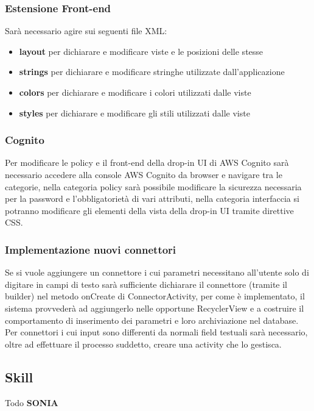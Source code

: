 \subsubsection{Estensione Front-end}
Sarà necessario agire sui seguenti file XML:
\begin{itemize}
\item \textbf{layout} per dichiarare e modificare viste e le posizioni delle stesse
\item \textbf{strings} per dichiarare e modificare stringhe utilizzate dall'applicazione
\item \textbf{colors} per dichiarare e modificare i colori utilizzati dalle viste
\item \textbf{styles} per dichiarare e modificare gli stili utilizzati dalle viste
\end{itemize}

\subsubsection{Cognito}
Per modificare le policy e il front-end della drop-in UI di AWS Cognito sarà necessario accedere alla console AWS Cognito da browser e navigare tra le categorie, nella categoria policy sarà possibile modificare la sicurezza necessaria per la password e l'obbligatorietà di vari attributi, nella categoria interfaccia si potranno modificare gli elementi della vista della drop-in UI tramite direttive CSS.

\subsubsection{Implementazione nuovi connettori}
Se si vuole aggiungere un connettore i cui parametri necessitano all'utente solo di digitare in campi di testo sarà sufficiente dichiarare il connettore (tramite il builder) nel metodo onCreate di ConnectorActivity, per come è implementato, il sistema provvederà ad aggiungerlo nelle opportune RecyclerView e a costruire il comportamento di inserimento dei parametri e loro archiviazione nel database.
Per connettori i cui input sono differenti da normali field testuali sarà necessario, oltre ad effettuare il processo suddetto, creare una activity che lo gestisca.

\subsection{Skill}
Todo \textbf{SONIA}
